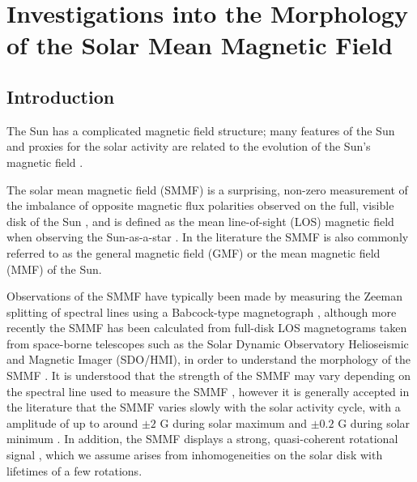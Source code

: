 \chapter{Investigations into the Morphology of the Solar Mean Magnetic Field}\label{chap:SMMF}

\section{Introduction}\label{sec:SMMF_intro}

The Sun has a complicated magnetic field structure; many features of the Sun and proxies for the solar activity are related to the evolution of the Sun's magnetic field \citep{wu_solar_2018}.

The solar mean magnetic field (SMMF) is a surprising, non-zero measurement of the imbalance of opposite magnetic flux polarities observed on the full, visible disk of the Sun \citep{svalgaard_suns_1975}, and is defined as the mean line-of-sight (LOS) magnetic field when observing the Sun-as-a-star \citep{scherrer_mean_1977, scherrer_mean_1977-1, garcia_integrated_1999}. In the literature the SMMF is also commonly referred to as the general magnetic field (GMF) \citep{severny_time_1971} or the mean magnetic field (MMF) \citep{kotov_mean_2008} of the Sun.

Observations of the SMMF have typically been made by measuring the Zeeman splitting of spectral lines using a Babcock-type magnetograph \citep{scherrer_mean_1977}, although more recently the SMMF has been calculated from full-disk LOS magnetograms taken from space-borne telescopes such as the Solar Dynamic Observatory Helioseismic and Magnetic Imager (SDO/HMI), in order to understand the morphology of the SMMF \citep{kutsenko_contribution_2017, bose_variability_2018}. It is understood that the strength of the SMMF may vary depending on the spectral line used to measure the SMMF \citep{kotov_mean_2008, kotov_enigmas_2012}, however it is generally accepted in the literature that the SMMF varies slowly with the solar activity cycle, with a amplitude of up to around $\pm 2$ G during solar maximum and $\pm 0.2$ G during solar minimum \citep{plachinda_general_2011}. In addition, the SMMF displays a strong, quasi-coherent rotational signal \citep{chaplin_studies_2003, xie_temporal_2017}, which we assume arises from inhomogeneities on the solar disk with lifetimes of a few rotations.

